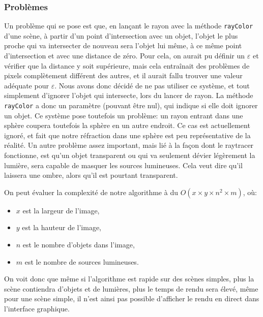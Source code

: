 \documentclass[a4paper]{article}
\begin{document}
    \subsubsection{Problèmes}
    Un problème qui se pose est que, en lançant le rayon avec la méthode \verb+rayColor+ d'une scène,
    à partir d'un point d'intersection avec un objet, l'objet le plus proche qui va intersecter de nouveau
    sera l'objet lui même, à ce même point d'intersection et avec une distance de zéro.
    Pour cela, on aurait pu définir un $\varepsilon$ et vérifier que la distance y soit supérieure, mais
    cela entraînait des problèmes de pixels complètement différent des autres, et il aurait fallu trouver
    une valeur adéquate pour $\varepsilon$. Nous avons donc décidé de ne pas utiliser ce système, et tout
    simplement d'ignorer l'objet qui intersecte, lors du lancer de rayon.
    La méthode \verb+rayColor+ a donc un paramètre (pouvant être nul), qui indique si elle doit ignorer un objet.
    Ce système pose toutefois un problème: un rayon entrant dans une sphère coupera toutefois la sphère en un autre
    endroit. Ce cas est actuellement ignoré, et fait que notre réfraction dans une sphère est peu représentative de la réalité.
    Un autre problème assez important, mais lié à la façon dont le raytracer fonctionne, est qu'un objet transparent ou qui va seulement
    dévier légèrement la lumière, sera capable de masquer les sources lumineuses.
    Cela veut dire qu'il laissera une ombre, alors qu'il est pourtant transparent.

    On peut évaluer la complexité de notre algorithme à du
    $O(x\times y\times n^2\times m)$, où:
    \begin{itemize}
        \item $x$ est la largeur de l'image,
        \item $y$ est la hauteur de l'image,
        \item $n$ est le nombre d'objets dans l'image,
        \item $m$ est le nombre de sources lumineuses.
    \end{itemize}
    On voit donc que même si l'algorithme est rapide sur des scènes simples,
    plus la scène contiendra d'objets et de lumières, plus le temps de rendu
    sera élevé, même pour une scène simple, il n'est ainsi pas possible
    d'afficher le rendu en direct dans l'interface graphique.
\end{document}
